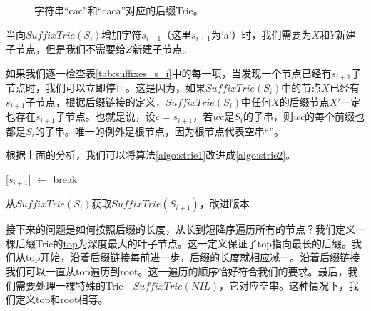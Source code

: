 \documentclass[UTF8]{article}
\begin{document}
\begin{figure}[htbp]
  \centering
  \caption{字符串“cac”和“caca”对应的后缀Trie。}
  \label{fig:strie-cac}
\end{figure}

当向$SuffixTrie(S_i)$增加字符$s_{i+1}$（这里$s_{i+1}$为‘a’）时，我们需要为$X$和$Y$新建子节点，但是我们不需要给$Z$新建子节点。

如果我们逐一检查表\ref{tab:suffixes_s_i}中的每一项，当发现一个节点已经有$s_{i+1}$子节点时，我们可以立即停止。这是因为，如果$SuffixTrie(S_i)$中的节点$X$已经有$s_{i+1}$子节点，根据后缀链接的定义，$SuffixTrie(S_i)$中任何$X$的后缀节点$X'$一定也存在$s_{i+1}$子节点。也就是说，设$c=s_{i+1}$，若$wc$是$S_i$的子串，则$wc$的每个前缀也都是$S_i$的子串\cite{ukkonen95}。唯一的例外是根节点，因为根节点代表空串“”。

根据上面的分析，我们可以将算法\ref{algo:strie1}改进成\ref{algo:strie2}。

\begin{algorithm}
  \begin{algorithmic}[1]
      \State {}[$s_{i+1}$] $\gets$ 
    \Else
      \State break
    \EndIf
  \EndFor
  \end{algorithmic}
  \caption{从$SuffixTrie(S_i)$获取$SuffixTrie(S_{i+1})$，改进版本}
  \label{algo:strie2}
\end{algorithm}

接下来的问题是如何按照后缀的长度，从长到短降序遍历所有的节点？我们定义一棵后缀Trie的\underline{top}为深度最大的叶子节点。这一定义保证了top指向最长的后缀。我们从top开始，沿着后缀链接每前进一步，后缀的长度就相应减一。沿着后缀链接我们可以一直从top遍历到root。这一遍历的顺序恰好符合我们的要求。最后，我们需要处理一棵特殊的Trie―$SuffixTrie(NIL)$，它对应空串。这种情况下，我们定义top和root相等。
\end{document}
